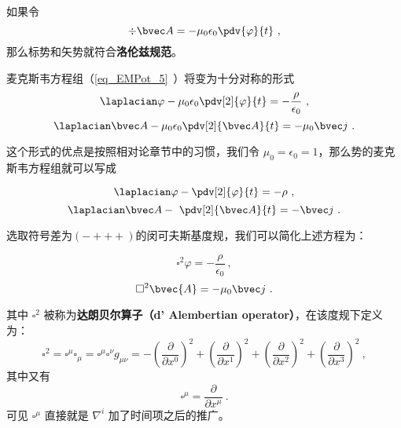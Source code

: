 
\begin{issues}
\issueDraft
\end{issues}


如果令
\begin{equation}
\div \bvec A = -\mu_0 \epsilon_0 \pdv{\varphi}{t}~,
\end{equation}
那么标势和矢势就符合\textbf{洛伦兹规范}。 

麦克斯韦方程组（\autoref{eq_EMPot_5}~）将变为十分对称的形式
\begin{equation}\label{eq_LoGaug_1}
\laplacian \varphi - \mu_0\epsilon_0 \pdv[2]{\varphi}{t} = -\frac{\rho}{\epsilon_0}~,
\end{equation}
\begin{equation}\label{eq_LoGaug_2}
\laplacian \bvec A - \mu_0\epsilon_0 \pdv[2]{\bvec A}{t} = -\mu_0 \bvec j~.
\end{equation}

这个形式的优点是按照相对论章节中的习惯，我们令 $\mu_0=\epsilon_0=1$，那么势的麦克斯韦方程组就可以写成

\begin{equation}
\laplacian \varphi -  \pdv[2]{\varphi}{t} = -\rho~,
\end{equation}
\begin{equation}
\laplacian \bvec A - \ \pdv[2]{\bvec A}{t} = - \bvec j~.
\end{equation}

选取符号差为$(-+++)$的闵可夫斯基度规，我们可以简化上述方程为：

\begin{equation}\label{eq_LoGaug_4}
\square^2 \varphi = -\frac{\rho}{\epsilon_0}~,
\end{equation}
\begin{equation}\label{eq_LoGaug_5}
\square^2 \bvec{A} = -\mu_0 \bvec j~.
\end{equation}

其中 $\square^2$ 被称为\textbf{达朗贝尔算子（d' Alembertian operator）}，在该度规下定义为：
\begin{equation}\label{eq_LoGaug_3}
\square^2=\square^\mu\square_\mu=\square^\mu\square^\nu g_{\mu\nu}=-(\frac{\partial}{\partial x^0})^2+(\frac{\partial}{\partial x^1})^2+(\frac{\partial}{\partial x^2})^2+(\frac{\partial}{\partial x^3})^2~,
\end{equation}
其中又有
\begin{equation}
\square^\mu=\frac{\partial}{\partial x^\mu}~.
\end{equation}
可见 $\square^\mu$ 直接就是 $\nabla^i$ 加了时间项之后的推广。

